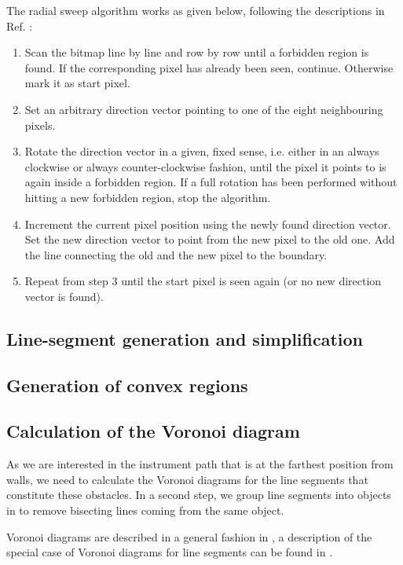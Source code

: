 The radial sweep algorithm works as given below, following the descriptions in Ref. \cite{web_radial_sweep}:
\begin{enumerate}
	\item Scan the bitmap line by line and row by row until a forbidden region is found. 
		If the corresponding pixel has already been seen, continue. Otherwise mark it as start pixel.
	\item Set an arbitrary direction vector pointing to one of the eight neighbouring pixels.
	\item Rotate the direction vector in a given, fixed sense, i.e. either in an always clockwise or 
		always counter-clockwise fashion, until the pixel it points to is again inside a forbidden region.
		If a full rotation has been performed without hitting a new forbidden region, stop the algorithm.
	\item Increment the current pixel position using the newly found direction vector. 
		Set the new direction vector to point from the new pixel to the old one.
		Add the line connecting the old and the new pixel to the boundary.
	\item Repeat from step 3 until the start pixel is seen again (or no new direction vector is found).
\end{enumerate}



\subsection{Line-segment generation and simplification}



\subsection{Generation of convex regions}



\subsection{Calculation of the Voronoi diagram}
As we are interested in the instrument path that is at the farthest position from walls, we need to calculate
the Voronoi diagrams for the line segments that constitute these obstacles. In a second step, we group line
segments into objects in to remove bisecting lines coming from the same object.

Voronoi diagrams are described in a general fashion in \cite[Ch. 7, pp. 147f]{Berg2008}, a description of the special
case of Voronoi diagrams for line segments can be found in \cite[Ch. 7.3, pp. 160-163]{Berg2008}.

